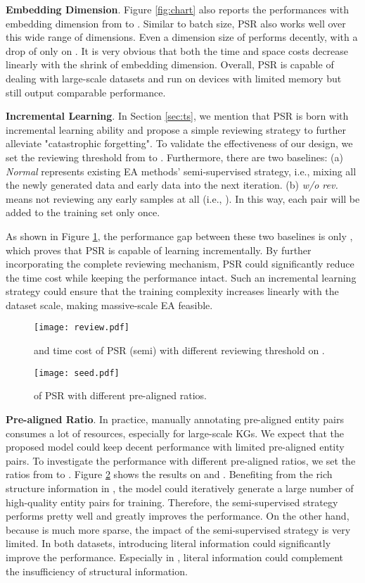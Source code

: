 \documentclass[sigconf]{acmart}
\begin{document}
\noindent
\textbf{Embedding Dimension}.
Figure \ref{fig:chart} also reports the performances with embedding dimension  from  to .
Similar to batch size, PSR also works well over this wide range of dimensions. 
Even a dimension size of  performs decently, with a drop of only  on .
It is very obvious that both the time and space costs decrease linearly with the shrink of embedding dimension.
Overall, PSR is capable of dealing with large-scale datasets and run on devices with limited memory but still output comparable performance.

\noindent
\textbf{Incremental Learning}.
In Section \ref{sec:ts}, we mention that PSR is born with incremental learning ability and propose a simple reviewing strategy to further alleviate "catastrophic forgetting".
To validate the effectiveness of our design, we set the reviewing threshold  from  to .
Furthermore, there are two baselines:
(a) \emph{Normal} represents existing EA methods' semi-supervised strategy, i.e., mixing all the newly generated data and early data into the next iteration.
(b) \emph{w/o rev.} means not reviewing any early samples at all (i.e., ).
In this way, each pair will be added to the training set only once.

As shown in Figure \ref{fig:review}, the performance gap between these two baselines is only , which proves that PSR is capable of learning incrementally.
By further incorporating the complete reviewing mechanism, PSR could significantly reduce the time cost while keeping the performance intact.
Such an incremental learning strategy could ensure that the training complexity increases linearly with the dataset scale, making massive-scale EA feasible.

\begin{figure}
  \centering
  \texttt{[image: review.pdf]}
  \caption{ and time cost of PSR (semi) with different reviewing threshold  on .}\label{fig:review}
\end{figure}
\noindent

\begin{figure}
  \centering
  \texttt{[image: seed.pdf]}
  \caption{ of PSR with different pre-aligned ratios.}\label{fig:seed}
\end{figure}

\noindent
\textbf{Pre-aligned Ratio}.
In practice, manually annotating pre-aligned entity pairs consumes a lot of resources, especially for large-scale KGs.
We expect that the proposed model could keep decent performance with limited pre-aligned entity pairs.
To investigate the performance with different pre-aligned ratios, we set the ratios from  to .
Figure \ref{fig:seed} shows the results on  and .
Benefiting from the rich structure information in , the model could iteratively generate a large number of high-quality entity pairs for training.
Therefore, the semi-supervised strategy performs pretty well and greatly improves the performance.
On the other hand, because  is much more sparse, the impact of the semi-supervised strategy is very limited.
In both datasets, introducing literal information could significantly improve the performance.
Especially in , literal information could complement the insufficiency of structural information.
\end{document}
